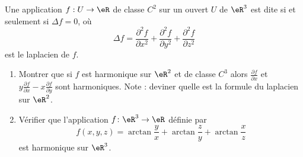 \begin{exercice}\label{exoCalculDifferentiel0018}

	Une application $f : U \to \eR $ de classe $C^2$ sur un ouvert $U$ de $\eR^3$ est dite  si et seulement si $\Delta f = 0$, où
	\begin{equation}
		\Delta f=\frac{ \partial^2f  }{ \partial x^2 }+\frac{ \partial^2f  }{ \partial y^2 }+\frac{ \partial^2f  }{ \partial z^2 }
	\end{equation}
 est le laplacien de $f$.
 \begin{enumerate}
 \item
  Montrer que si $f$ est harmonique sur $\eR^2$ et de classe $C^3$ alors $\frac{\partial f}{\partial x}$ et $y \frac{\partial f}{\partial x} - x \frac{\partial f}{\partial y}$ sont harmoniques. Note : deviner quelle est la formule du laplacien sur $\eR^2$.
 \item
	 Vérifier que l'application $f\colon\eR^3\to \eR$ définie par
	 \begin{equation}
 		f(x,y,z)  = \arctan \frac{y}{x} + \arctan \frac{z}{y} + \arctan \frac{x}{z}
	 \end{equation}
est harmonique sur $\eR^3$.
 \end{enumerate}
 
\end{exercice}
